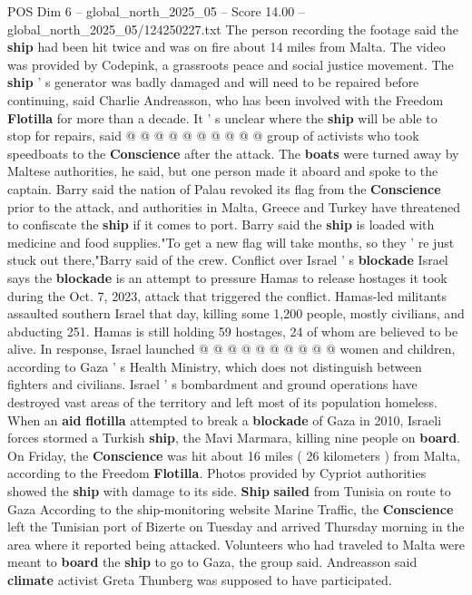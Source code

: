 \begin{textsample}{POS Dim 6 – global\_north\_2025\_05 – Score 14.00 – global\_north\_2025\_05/124250227.txt}
The person recording the footage said the \textbf{ship} had been hit twice and was on fire about 14 miles from Malta.
The video was provided by Codepink, a grassroots peace and social justice movement.
The \textbf{ship} ' s generator was badly damaged and will need to be repaired before continuing, said Charlie Andreasson, who has been involved with the Freedom \textbf{Flotilla} for more than a decade.
It ' s unclear where the \textbf{ship} will be able to stop for repairs, said @ @ @ @ @ @ @ @ @ @ group of activists who took speedboats to the \textbf{Conscience} after the attack.
The \textbf{boats} were turned away by Maltese authorities, he said, but one person made it aboard and spoke to the captain.
Barry said the nation of Palau revoked its flag from the \textbf{Conscience} prior to the attack, and authorities in Malta, Greece and Turkey have threatened to confiscate the \textbf{ship} if it comes to port.
Barry said the \textbf{ship} is loaded with medicine and food supplies."To get a new flag will take months, so they ' re just stuck out there,"Barry said of the crew.
Conflict over Israel ' s \textbf{blockade} Israel says the \textbf{blockade} is an attempt to pressure Hamas to release hostages it took during the Oct. 7, 2023, attack that triggered the conflict.
Hamas-led militants assaulted southern Israel that day, killing some 1,200 people, mostly civilians, and abducting 251.
Hamas is still holding 59 hostages, 24 of whom are believed to be alive.
In response, Israel launched @ @ @ @ @ @ @ @ @ @ women and children, according to Gaza ' s Health Ministry, which does not distinguish between fighters and civilians.
Israel ' s bombardment and ground operations have destroyed vast areas of the territory and left most of its population homeless.
When an \textbf{aid} \textbf{flotilla} attempted to break a \textbf{blockade} of Gaza in 2010, Israeli forces stormed a Turkish \textbf{ship}, the Mavi Marmara, killing nine people on \textbf{board}.
On Friday, the \textbf{Conscience} was hit about 16 miles ( 26 kilometers ) from Malta, according to the Freedom \textbf{Flotilla}.
Photos provided by Cypriot authorities showed the \textbf{ship} with damage to its side. \textbf{Ship} \textbf{sailed} from Tunisia on route to Gaza According to the ship-monitoring website Marine Traffic, the \textbf{Conscience} left the Tunisian port of Bizerte on Tuesday and arrived Thursday morning in the area where it reported being attacked.
Volunteers who had traveled to Malta were meant to \textbf{board} the \textbf{ship} to go to Gaza, the group said.
Andreasson said \textbf{climate} activist Greta Thunberg was supposed to have participated.

\end{textsample}

